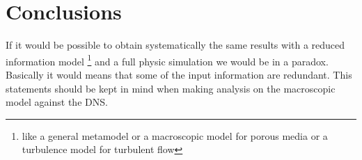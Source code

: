 \section{Conclusions}

If it would be possible to obtain systematically the same results with a reduced information model \footnote{like a general metamodel or a macroscopic model for porous media or a turbulence model for turbulent flow} and a full physic simulation we would be in a paradox. Basically it would means that some of the input information are redundant. This statements should be kept in mind when making analysis on the macroscopic model against the DNS.


